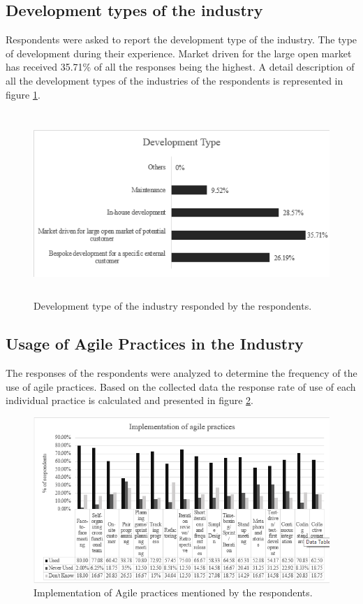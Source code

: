 \documentclass[a4paper,oneside]{bth}
\begin{document}
\subsection{Development types of the industry}
Respondents were asked to report the development type of the industry. The type of development during their experience. Market driven for the large open market has received 35.71\% of all the responses being the highest. A detail description of all the development types of the industries of the respondents is represented in figure \ref{development type}.
\begin{figure}[h]
\centering
\includegraphics[height=7cm]{Development type.png}
\caption{Development type of the industry responded by the respondents. \label{development type}}
\end{figure}

\subsection{Usage of Agile Practices in the Industry}
The responses of the respondents were analyzed to determine the frequency of the use of agile practices. Based on the collected data the response rate of use of each individual practice is calculated and presented in figure \ref{usage}.
\begin{figure}[h]
\centering
\includegraphics[width= 14cm]{usage.png}
\caption{Implementation of Agile practices mentioned by the respondents. \label{usage}}
\end{figure}
\end{document}
